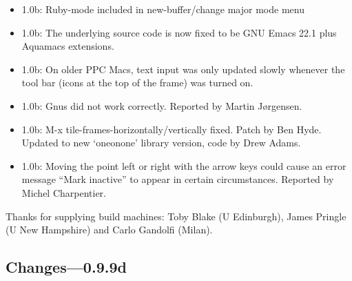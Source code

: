 \begin{itemize}
\item 1.0b: Ruby-mode included in new-buffer/change major mode menu

\item 1.0b: The underlying source code is now fixed to be GNU Emacs 22.1 plus Aquamacs extensions.

\item 1.0b: On older PPC Macs, text input was only updated slowly whenever the tool bar (icons at the top of the frame) was turned on.

\item 1.0b: Gnus did not work correctly. Reported by Martin Jørgensen.

\item 1.0b: M-x tile-frames-{horizontally/vertically} fixed. Patch by Ben Hyde. Updated to new `oneonone' library version, code by Drew Adams.

\item 1.0b: Moving the point left or right with the arrow keys could cause an error message ``Mark inactive'' to appear in certain circumstances. Reported by Michel Charpentier.


\end{itemize}


        Thanks for supplying build machines: Toby Blake (U Edinburgh),
        James Pringle (U New Hampshire) and Carlo Gandolfi (Milan).


\subsection{Changes---0.9.9d}


